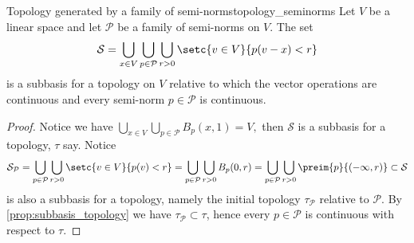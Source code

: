 \begin{proposition}{Topology generated by a family of semi-norms}{topology_seminorms}
    Let \(V\) be a linear space and let \(\mathcal{P}\) be a family of semi-norms on \(V\). The set
    \begin{equation*}
        \mathcal{S} = \bigcup_{x \in V}{\bigcup_{p \in \mathcal{P}}{\bigcup_{r > 0}{\setc{v \in V}{p(v - x) < r}}}}
    \end{equation*}
    is a subbasis for a topology on \(V\) relative to which the vector operations are continuous and every semi-norm \(p \in \mathcal{P}\) is continuous.
\end{proposition}
\begin{proof}
    Notice we have \(\bigcup_{x \in V}\bigcup_{p \in \mathcal{P}} B_p(x, 1) = V,\) then \(\mathcal{S}\) is a subbasis for a topology, \(\tau\) say. Notice
    \begin{equation*}
        \mathcal{S}_\mathcal{P} = \bigcup_{p \in \mathcal{P}}\bigcup_{r > 0} \setc{v \in V}{p(v) < r} = \bigcup_{p \in \mathcal{P}}\bigcup_{r > 0} B_p(0, r) = \bigcup_{p \in \mathcal{P}}\bigcup_{r > 0} \preim{p}{(-\infty,r)} \subset \mathcal{S}
    \end{equation*}
    is also a subbasis for a topology, namely the initial topology \(\tau_{\mathcal{P}}\) relative to \(\mathcal{P}\). By \cref{prop:subbasis_topology} we have \(\tau_{\mathcal{P}} \subset \tau\), hence every \(p \in \mathcal{P}\) is continuous with respect to \(\tau\).


\end{proof}

